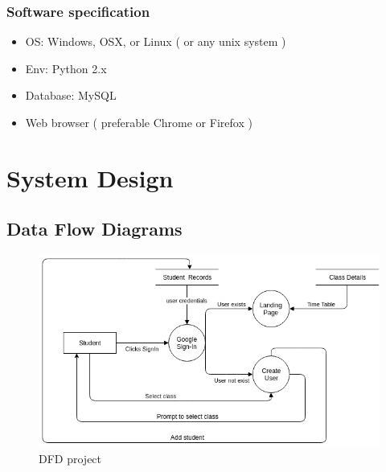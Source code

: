 \documentclass{article}
\begin{document}
\subsubsection{Software specification}
\begin{itemize}
\item OS: Windows, OSX, or Linux ( or any unix system )
\item Env: Python 2.x
\item Database: MySQL
\item Web browser ( preferable Chrome or Firefox )
\end{itemize}
\vspace{1em}

\vspace{1em}

\newpage

\section{System Design}
\vspace{1em}

\subsection{Data Flow Diagrams}
\vspace{1em}

\begin{figure}
  \includegraphics[width=\linewidth]{DFD1.png}
  \caption{DFD project}
\end{figure}
\end{document}
